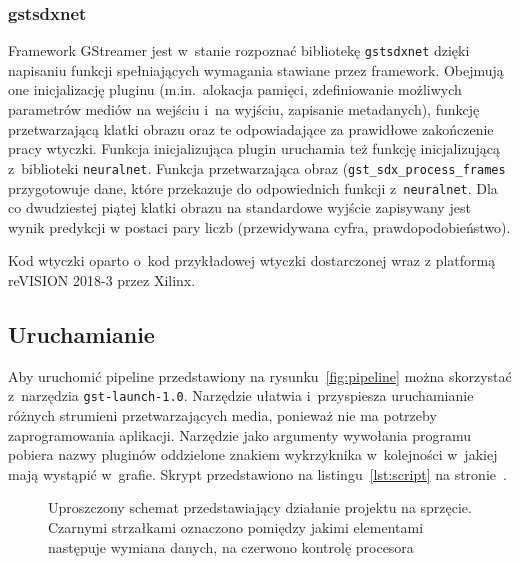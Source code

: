 \documentclass[12pt, oneside, a4paper]{article}
\begin{document}
\subsubsection{gstsdxnet}\label{sec:gstsdxnet}
Framework GStreamer jest w~stanie rozpoznać bibliotekę \lstinline{gstsdxnet}
dzięki napisaniu funkcji spełniających wymagania stawiane przez framework.
Obejmują one inicjalizację pluginu (m.in.~alokacja pamięci, zdefiniowanie
możliwych parametrów mediów na wejściu i~na wyjściu, zapisanie
metadanych), funkcję
przetwarzającą klatki obrazu oraz te odpowiadające za prawidłowe zakończenie
pracy wtyczki. Funkcja inicjalizująca plugin uruchamia też funkcję
inicjalizującą z~biblioteki \lstinline{neuralnet}.
Funkcja przetwarzająca obraz (\lstinline{gst_sdx_process_frames}
przygotowuje dane, które przekazuje do
odpowiednich funkcji z~\lstinline{neuralnet}. Dla co dwudziestej piątej
klatki obrazu na standardowe wyjście zapisywany jest wynik predykcji
w postaci pary liczb (przewidywana cyfra, prawdopodobieństwo). 

Kod wtyczki oparto o~kod przykładowej wtyczki dostarczonej wraz
z platformą reVISION \mbox{2018-3} przez Xilinx.

\newpage
\subsection{Uruchamianie}\label{sec:Uruchamianie}
Aby uruchomić pipeline przedstawiony na rysunku~\ref{fig:pipeline}
można skorzystać z~narzędzia \lstinline{gst-launch-1.0}.
Narzędzie ułatwia i~przyspiesza uruchamianie różnych strumieni
przetwarzających media, ponieważ nie ma potrzeby zaprogramowania
aplikacji. Narzędzie jako argumenty wywołania programu pobiera
nazwy pluginów oddzielone znakiem wykrzyknika
w~kolejności w~jakiej mają wystąpić w~grafie. Skrypt przedstawiono
na listingu~\ref{lst:script} na stronie~\pageref{lst:script}.

\begin{figure}[h]
  \centering
  
  \caption{Uproszczony schemat przedstawiający działanie
  projektu na sprzęcie.
  Czarnymi strzałkami oznaczono pomiędzy jakimi elementami
  następuje wymiana danych, na czerwono kontrolę procesora}\label{fig:physical-scheme}
\end{figure}

\newpage
\begin{minipage}{\linewidth}

\end{minipage}
\end{document}
